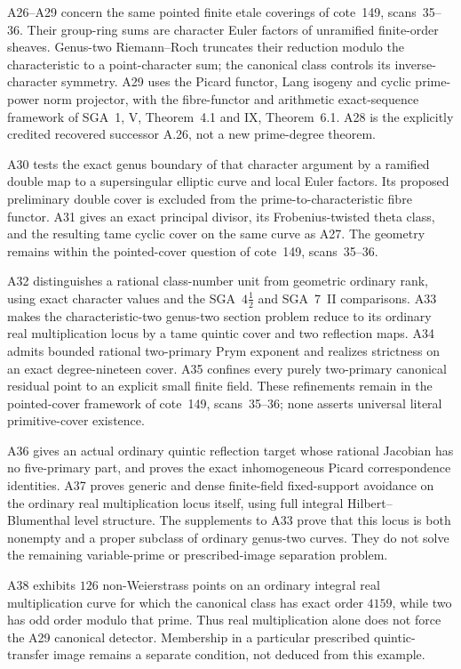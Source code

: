 \documentclass[11pt,a4paper]{article}
\begin{document}
A26--A29 concern the same pointed finite etale coverings of cote~149,
scans~35--36. Their group-ring sums are character Euler factors of
unramified finite-order sheaves. Genus-two Riemann--Roch truncates their
reduction modulo the characteristic to a point-character sum; the
canonical class controls its inverse-character symmetry. A29 uses
the Picard functor, Lang isogeny and cyclic prime-power norm projector,
with the fibre-functor and arithmetic exact-sequence framework of
SGA~1, V, Theorem~4.1 and IX, Theorem~6.1. A28 is the explicitly
credited recovered successor A.26, not a new prime-degree theorem.

A30 tests the exact genus boundary of that character argument by a
ramified double map to a supersingular elliptic curve and local Euler
factors. Its proposed preliminary double cover is excluded from the
prime-to-characteristic fibre functor. A31 gives an exact principal
divisor, its Frobenius-twisted theta class, and the resulting tame cyclic
cover on the same curve as A27. The geometry remains within the
pointed-cover question of cote~149, scans~35--36.

A32 distinguishes a rational class-number unit from geometric ordinary rank,
using exact character values and the SGA~$4\frac12$ and SGA~7~II comparisons.
A33 makes the characteristic-two genus-two section problem reduce to its
ordinary real multiplication locus by a tame quintic cover and two reflection
maps. A34 admits bounded rational two-primary Prym exponent and realizes
strictness on an exact degree-nineteen cover. A35 confines every purely
two-primary canonical residual point to an explicit small finite field.
These refinements remain in the pointed-cover framework of cote~149,
scans~35--36; none asserts universal literal primitive-cover existence.

A36 gives an actual ordinary quintic reflection target whose rational
Jacobian has no five-primary part, and proves the exact inhomogeneous
Picard correspondence identities. A37 proves generic and dense
finite-field fixed-support avoidance on the ordinary real multiplication
locus itself, using full integral Hilbert--Blumenthal level structure.
The supplements to A33 prove that this locus is both nonempty and a
proper subclass of ordinary genus-two curves. They do not solve the
remaining variable-prime or prescribed-image separation problem.

A38 exhibits $126$ non-Weierstrass points on an ordinary integral
real multiplication curve for which the canonical class has exact
order $4159$, while two has odd order modulo that prime. Thus real
multiplication alone does not force the A29 canonical detector.
Membership in a particular prescribed quintic-transfer image remains
a separate condition, not deduced from this example.
\end{document}
